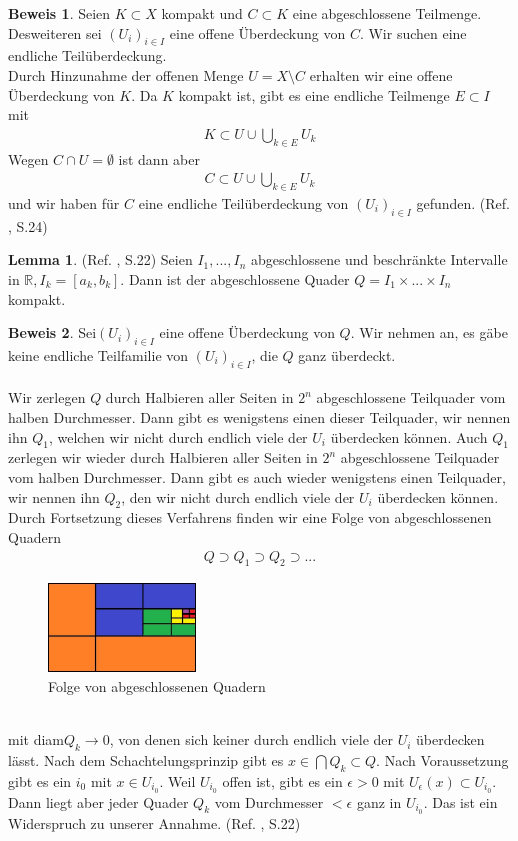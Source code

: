 \documentclass[10pt,a4paper]{article}
\theoremstyle{plain}
\theoremstyle{definition}
\newtheorem{lemma}[satz]{Lemma}
\newenvironment{lem}{\begin{shaded}\begin{lemma}}{\end{lemma}\end{shaded}}
\theoremstyle{nonumberplain}
\newtheorem{beweis}{Beweis}
\newenvironment{bew}{\begin{beweis}}{\end{beweis}}
\newcommand{\R}{\mathbb{R}}
\begin{document}
\begin{bew}
Seien $K \subset X$ kompakt und $C \subset K$ eine abgeschlossene Teilmenge. Desweiteren sei $(U_i)_{i \in I}$ eine offene Überdeckung von $C$. Wir suchen eine endliche Teilüberdeckung.\\
Durch Hinzunahme der offenen Menge $U = X \setminus C$ erhalten wir eine offene Überdeckung von $K$. Da $K$ kompakt ist, gibt es eine endliche Teilmenge $E \subset I$ mit 
\begin{align*}
K\subset U \cup \bigcup_{k \in E }{U_k}
\end{align*}
Wegen $C \cap U = \emptyset$ ist dann aber
\begin{align*}
C \subset U \cup \bigcup_{k \in E }{U_k}
\end{align*}
und wir haben für $C$ eine endliche Teilüberdeckung von $(U_i)_{i \in I}$ gefunden. (Ref. \cite{tu}, S.24)
\end{bew}
\begin{lem}
\label{quader}
(Ref. \cite{tu}, S.22) Seien $I_1, ..., I_n$ abgeschlossene und beschränkte Intervalle in $\R, I_k = [a_k, b_k]$.  Dann ist der abgeschlossene Quader $Q = I_1 \times ... \times I_n$ kompakt.
\end{lem}
\begin{bew}
Sei${(U_i)}_{i \in I}$ eine offene Überdeckung von $Q$. Wir nehmen an, es gäbe keine endliche Teilfamilie von $ {(U_i)}_{i \in I}$, die $Q$ ganz überdeckt.\\\\
Wir zerlegen $Q$ durch Halbieren aller Seiten in $2^n$ abgeschlossene Teilquader vom halben Durchmesser. Dann gibt es wenigstens einen dieser Teilquader, wir nennen ihn $Q_1$, welchen wir nicht durch endlich viele der $U_i$ überdecken können. Auch $Q_1$ zerlegen wir wieder durch Halbieren aller Seiten in $2^n$ abgeschlossene Teilquader vom halben Durchmesser. Dann gibt es auch wieder wenigstens einen Teilquader, wir nennen ihn $Q_2$, den wir nicht durch endlich viele der $U_i$ überdecken können. Durch Fortsetzung dieses Verfahrens finden wir eine Folge von abgeschlossenen Quadern 
\begin{align*}
Q \supset Q_1 \supset Q_2 \supset ...
\end{align*}
\begin{figure}[h]
\centering
\includegraphics[width=0.35\textwidth]{pictures/heine-borel-theorem}
\caption{Folge von abgeschlossenen Quadern}
\end{figure}
\quad\\
mit diam$Q_k \rightarrow 0$, von denen sich keiner durch endlich viele der $U_i$ überdecken lässt. Nach dem Schachtelungsprinzip gibt es $x \in \bigcap Q_k \subset Q$. Nach Voraussetzung gibt es ein $i_0$ mit $x \in U_{i_0}$. Weil $U_{i_0}$ offen ist, gibt es ein $\epsilon > 0$ mit $U_\epsilon(x) \subset U_{i_0}$. Dann liegt aber jeder Quader $Q_k$ vom Durchmesser $<\epsilon$ ganz in $U_{i_0}$. Das ist ein Widerspruch zu unserer Annahme. (Ref. \cite{tu}, S.22)
\end{bew}
\end{document}

